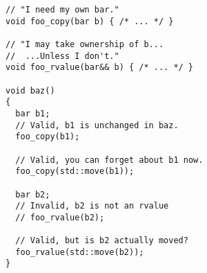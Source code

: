 \begin{lstlisting}
// "I need my own bar."
void foo_copy(bar b) { /* ... */ }

// "I may take ownership of b...
//  ...Unless I don't."
void foo_rvalue(bar&& b) { /* ... */ }

void baz()
{
  bar b1;
  // Valid, b1 is unchanged in baz.
  foo_copy(b1);

  // Valid, you can forget about b1 now.
  foo_copy(std::move(b1));
  
  bar b2;
  // Invalid, b2 is not an rvalue
  // foo_rvalue(b2);

  // Valid, but is b2 actually moved?
  foo_rvalue(std::move(b2));
}
\end{lstlisting}
